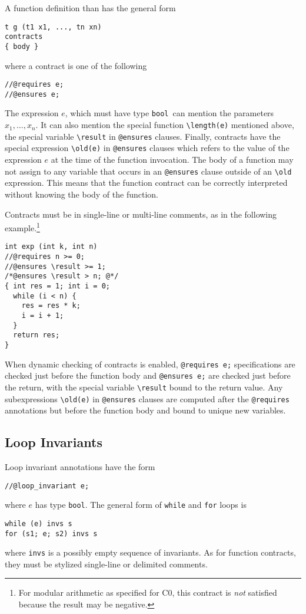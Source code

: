 \documentclass[11pt]{article}
\newcommand{\tbool}{\texttt{bool}}
\begin{document}
A function definition than has the general form
\begin{verbatim}
t g (t1 x1, ..., tn xn)
contracts
{ body }
\end{verbatim}
where a contract is one of the following
\begin{verbatim}
//@requires e;
//@ensures e;
\end{verbatim}
The expression $e$, which must have type \tbool\ can mention the
parameters $x_1, \ldots, x_n$.  It can also mention the special
function \verb'\length(e)' mentioned above, the special variable
\verb'\result' in \verb'@ensures' clauses.  Finally, contracts have
the special expression \verb'\old(e)' in \verb'@ensures' clauses which
refers to the value of the expression $e$ at the time of the function
invocation.  The body of a function may not assign to any variable
that occurs in an \verb'@ensures' clause outside of an \verb'\old'
expression.  This means that the function contract can be correctly
interpreted without knowing the body of the function.

Contracts must be in single-line or multi-line comments, as in the
following example.\footnote{For modular arithmetic as specified
for C0, this contract is \emph{not} satisfied because the result may be
negative.}
\begin{verbatim}
int exp (int k, int n)
//@requires n >= 0;
//@ensures \result >= 1;
/*@ensures \result > n; @*/
{ int res = 1; int i = 0;
  while (i < n) {
    res = res * k;
    i = i + 1;
  }
  return res;
}
\end{verbatim}

When dynamic checking of contracts is enabled,
\verb'@requires e;' specifications are checked just
before the function body and \verb'@ensures e;'
are checked just before the return, with the special
variable \verb'\result' bound to the return value.
Any subexpressions \verb'\old(e)' in \verb'@ensures' clauses
are computed after the \verb'@requires' annotations
but before the function body and bound to unique
new variables.

\subsection{Loop Invariants}

Loop invariant annotations have the form
\begin{verbatim}
//@loop_invariant e;
\end{verbatim}
where $e$ has type \tbool.  The general form of \verb'while'
and \verb'for' loops is
\begin{verbatim}
while (e) invs s
for (s1; e; s2) invs s
\end{verbatim}
where \verb'invs' is a possibly empty sequence of invariants.
As for function contracts, they must be stylized single-line
or delimited comments.
\end{document}
